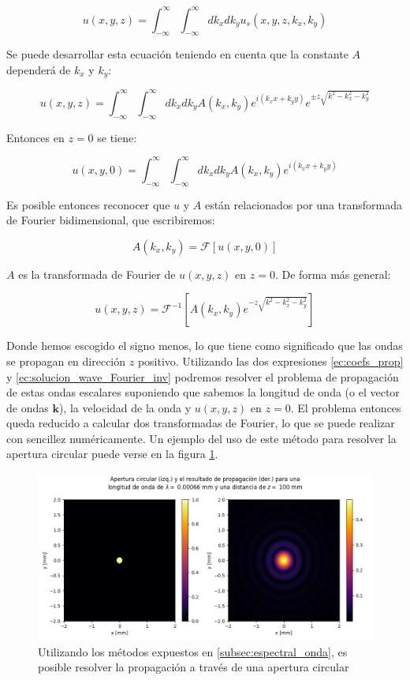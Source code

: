 \begin{equation}
    u(x, y, z) = \int_{-\infty}^\infty \int_{-\infty}^\infty dk_x dk_y u_s(x, y, z, k_x, k_y)
\end{equation}

Se puede desarrollar esta ecuación teniendo en cuenta que la constante $A$ dependerá de $k_x$ y $k_y$:

\begin{equation}
    u(x, y, z) = \int_{-\infty}^\infty \int_{-\infty}^\infty dk_x dk_y A(k_x, k_y) e^{i(k_x x + k_y y )} e^{\pm z \sqrt{k^2 - k_x^2 - k_y^2}}
\end{equation}

Entonces en $z = 0$ se tiene:

\begin{equation}
    u(x, y, 0) = \int_{-\infty}^\infty \int_{-\infty}^\infty dk_x dk_y A(k_x, k_y) e^{i(k_x x + k_y y )}
\end{equation}

Es posible entonces reconocer que $u$ y $A$ están relacionados por una transformada de Fourier bidimensional, que escribiremos:

\begin{equation}\label{ec:coefs_prop}
    A(k_x, k_y) = \mathcal{F}[u(x, y, 0)]
\end{equation}

$A$ es la transformada de Fourier de $u(x, y, z)$ en $z = 0$. De forma más general:

\begin{equation}\label{ec:solucion_wave_Fourier_inv}
     u(x, y, z) = \mathcal{F}^{-1}[A(k_x, k_y)e^{- z \sqrt{k^2 - k_x^2 - k_y^2}}]
\end{equation}

Donde hemos escogido el signo menos, lo que tiene como significado que las ondas se propagan en dirección $z$ positivo. Utilizando las dos expresiones \ref{ec:coefs_prop} y \ref{ec:solucion_wave_Fourier_inv} podremos resolver el problema de propagación de estas ondas escalares suponiendo que sabemos la longitud de onda (o el vector de ondas $\mathbf{k}$), la velocidad de la onda y $u(x, y, z)$ en $z = 0$. El problema entonces queda reducido a calcular dos transformadas de Fourier, lo que se puede realizar con sencillez numéricamente. Un ejemplo del uso de este método para resolver la apertura circular puede verse en la figura \ref{fig:ejemplo_diff}. 

\begin{figure}
    \centering
    \includegraphics[width=0.7\linewidth]{figures/ejemplo_diff.png}
    \caption{Utilizando los métodos expuestos en \ref{subsec:espectral_onda}, es posible resolver la propagación a través de una apertura circular}
    \label{fig:ejemplo_diff}
\end{figure}

